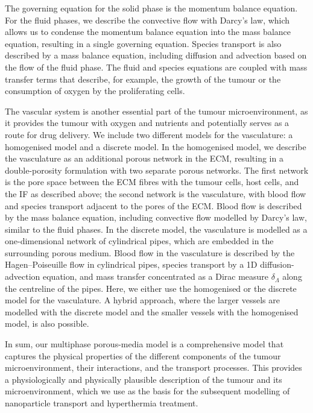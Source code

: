 \documentclass[Times1COL,AMA]{WileyNJDv5} %
\begin{document}
The governing equation for the solid phase is the momentum balance equation.
For the fluid phases, we describe the convective flow with Darcy's law, which allows us to condense the momentum balance equation into the mass balance equation, resulting in a single governing equation.
Species transport is also described by a mass balance equation, including diffusion and advection based on the flow of the fluid phase.
The fluid and species equations are coupled with mass transfer terms that describe, for example, the growth of the tumour or the consumption of oxygen by the proliferating cells. \cite{Sciume2013,Kremheller2018}

The vascular system is another essential part of the tumour microenvironment, as it provides the tumour with oxygen and nutrients and potentially serves as a route for drug delivery.
We include two different models for the vasculature: a homogenised model and a discrete model.
In the homogenised model, we describe the vasculature as an additional porous network in the ECM, resulting in a double-porosity formulation with two separate porous networks.
The first network is the pore space between the ECM fibres with the tumour cells, host cells, and the IF as described above;
the second network is the vasculature, with blood flow and species transport adjacent to the pores of the ECM. \cite{Kremheller2018}
Blood flow is described by the mass balance equation, including convective flow modelled by Darcy's law, similar to the fluid phases.
In the discrete model, the vasculature is modelled as a one-dimensional network of cylindrical pipes, which are embedded in the surrounding porous medium.
Blood flow in the vasculature is described by the Hagen--Poiseuille flow in cylindrical pipes, species transport by a 1D diffusion-advection equation, and mass transfer concentrated as a Dirac measure $\delta_\Lambda$ along the centreline of the pipes. \cite{Kremheller2019}
Here, we either use the homogenised or the discrete model for the vasculature.
A hybrid approach, where the larger vessels are modelled with the discrete model and the smaller vessels with the homogenised model, is also possible. \cite{Kremheller2019,Kremheller2021}

In sum, our multiphase porous-media model is a comprehensive model that captures the physical properties of the different components of the tumour microenvironment, their interactions, and the transport processes.
This provides a physiologically and physically plausible description of the tumour and its microenvironment, which we use as the basis for the subsequent modelling of nanoparticle transport and hyperthermia treatment.
\end{document}
